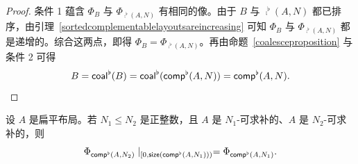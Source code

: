 \begin{proof}
    条件 1 蕴含 $\Phi_{B}$ 与 $\Phi_{\comp^\flat(A,N)}$ 有相同的像。由于 $B$ 与 $\comp^\flat(A,N)$ 都已排序，由引理~\ref{sortedcomplementablelayoutsareincreasing} 可知 $\Phi_{B}$ 与 $\Phi_{\comp^\flat(A,N)}$ 都是递增的。综合这两点，即得 $\Phi_{B} = \Phi_{\comp^\flat(A,N)}$。再由命题~\ref{coalesceproposition} 与条件 2 可得
    \[
    B = \mathsf{coal}^\flat(B) = \mathsf{coal}^\flat(\mathsf{comp}^\flat(A,N)) = \mathsf{comp}^\flat(A,N).
    \]
\end{proof}


\begin{lemma}\label{compatibilityofNcomplements}
    设 $A$ 是扁平布局。若 $N_1 \leq N_2$ 是正整数，且 $A$ 是 $N_1$-可求补的、$A$ 是 $N_2$-可求补的，则
    \[
    \Phi_{\mathsf{comp}^\flat(A,N_2)} \mid_{[0,\mathsf{size}(\mathsf{comp}^\flat(A,N_1)))} = \Phi_{\mathsf{comp}^\flat(A,N_1)}.
    \]
\end{lemma}

